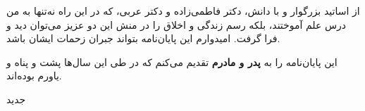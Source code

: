 


\begin{center}
\end{center}

از اساتید بزرگوار و با دانش، دکتر فاطمی‌زاده و دکتر عربی، که در این راه نه‌تنها به من درس علم آموختند، بلکه رسم زندگی و اخلاق را در منش این دو عزیز می‌توان دید و فرا گرفت. امیدوارم این پایان‌نامه بتواند جبران زحمات ایشان باشد.

این پایان‌نامه را به \textbf{پدر و مادرم} تقدیم می‌کنم که در طی این سال‌ها پشت و پناه و یاورم بوده‌اند.

‌جدید

